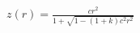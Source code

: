 \documentclass[convert={convertexe={magick.exe}}]{standalone}
\begin{document}
$ z(r) = \frac{cr^2}{1+\sqrt{1-(1+k)c^2r^2}} $
\end{document}
